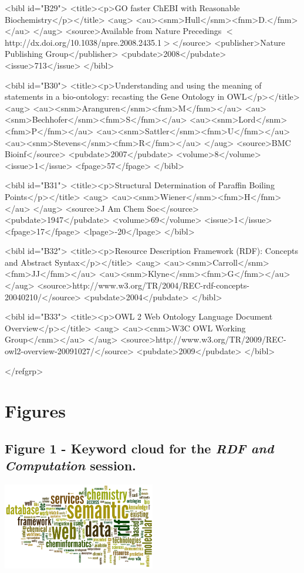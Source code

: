 \documentclass[10pt]{bmc_article}
\newenvironment{bmcformat}{\begin{raggedright}\baselineskip20pt\sloppy\setboolean{publ}{false}}{\end{raggedright}\baselineskip20pt\sloppy}
\begin{document}
\begin{bmcformat}
{<bibl id="B29">
  <title><p>{GO} faster {ChEBI} with Reasonable Biochemistry</p></title>
  <aug>
    <au><snm>Hull</snm><fnm>D.</fnm></au>
  </aug>
  <source>Available from Nature Precedings
  $<$http://dx.doi.org/10.1038/npre.2008.2435.1$>$</source>
  <publisher>Nature Publishing Group</publisher>
  <pubdate>2008</pubdate>
  <issue>713</issue>
</bibl>

<bibl id="B30">
  <title><p>Understanding and using the meaning of statements in a
  bio-ontology: recasting the Gene Ontology in {OWL}</p></title>
  <aug>
    <au><snm>Aranguren</snm><fnm>M</fnm></au>
    <au><snm>Bechhofer</snm><fnm>S</fnm></au>
    <au><snm>Lord</snm><fnm>P</fnm></au>
    <au><snm>Sattler</snm><fnm>U</fnm></au>
    <au><snm>Stevens</snm><fnm>R</fnm></au>
  </aug>
  <source>BMC Bioinf</source>
  <pubdate>2007</pubdate>
  <volume>8</volume>
  <issue>1</issue>
  <fpage>57</fpage>
</bibl>

<bibl id="B31">
  <title><p>Structural Determination of Paraffin Boiling Points</p></title>
  <aug>
    <au><snm>Wiener</snm><fnm>H</fnm></au>
  </aug>
  <source>J Am Chem Soc</source>
  <pubdate>1947</pubdate>
  <volume>69</volume>
  <issue>1</issue>
  <fpage>17</fpage>
  <lpage>-20</lpage>
</bibl>

<bibl id="B32">
  <title><p>Resource Description Framework ({RDF}): Concepts and Abstract
  Syntax</p></title>
  <aug>
    <au><snm>Carroll</snm><fnm>JJ</fnm></au>
    <au><snm>Klyne</snm><fnm>G</fnm></au>
  </aug>
  <source>http://www.w3.org/TR/2004/REC-rdf-concepts-20040210/</source>
  <pubdate>2004</pubdate>
</bibl>

<bibl id="B33">
  <title><p>{OWL} 2 Web Ontology Language Document Overview</p></title>
  <aug>
    <au><cnm>{W3C OWL Working Group}</cnm></au>
  </aug>
  <source>http://www.w3.org/TR/2009/REC-owl2-overview-20091027/</source>
  <pubdate>2009</pubdate>
</bibl>

</refgrp>
} %



\clearpage

\section*{Figures}

  \subsection*{Figure 1 - Keyword cloud for the \textit{RDF and Computation} session.}
  \includegraphics[width=0.5\textwidth]{graphics/wordle_cinf003} 


\end{bmcformat}
\end{document}
